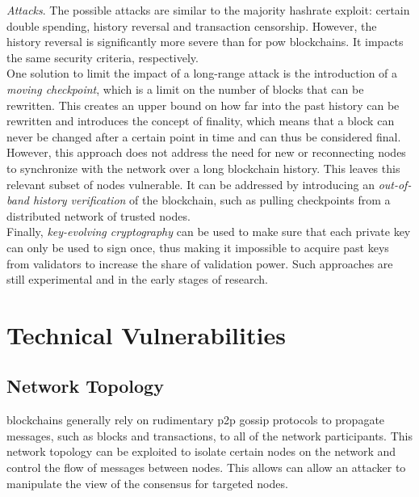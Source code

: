 \documentclass[12pt,a4paper]{article}
\begin{document}
\textit{Attacks}. The possible attacks are similar to the majority hashrate exploit: certain double spending, history reversal and transaction censorship. However, the history reversal is significantly more severe than for \acrshort{pow} \glspl{blockchain}. It impacts the same security criteria, respectively.\\

One solution to limit the impact of a long-range attack is the introduction of a \textit{moving checkpoint}, which is a limit on the number of blocks that can be rewritten. This creates an upper bound on how far into the past history can be rewritten and introduces the concept of finality, which means that a block can never be changed after a certain point in time and can thus be considered final.\\

However, this approach does not address the need for new or reconnecting nodes to synchronize with the network over a long blockchain history. This leaves this relevant subset of nodes vulnerable. It can be addressed by introducing an \textit{out-of-band history verification} of the blockchain, such as pulling checkpoints from a distributed network of trusted nodes.\\

Finally, \textit{key-evolving cryptography} can be used to make sure that each private key can only be used to sign once, thus making it impossible to acquire past keys from validators to increase the share of validation power. Such approaches are still experimental and in the early stages of research.\\

\section{Technical Vulnerabilities}

\subsection{Network Topology}

\Glspl{blockchain} generally rely on rudimentary \acrshort{p2p} gossip protocols to propagate messages, such as \glspl{block} and \glspl{transaction}, to all of the network participants. This network topology can be exploited to isolate certain nodes on the network and control the flow of messages between nodes. This allows can allow an attacker to manipulate the view of the \gls{consensus} for targeted nodes.\\
\end{document}
